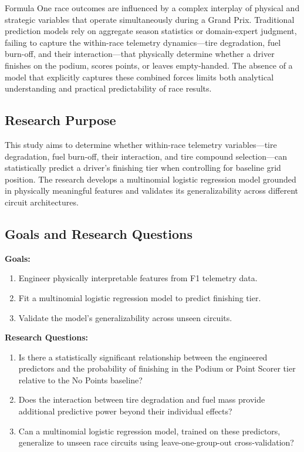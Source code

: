 Formula One race outcomes are influenced by a complex interplay of physical
and strategic variables that operate simultaneously during a Grand Prix.
Traditional prediction models rely on aggregate season statistics or
domain-expert judgment, failing to capture the within-race telemetry
dynamics---tire degradation, fuel burn-off, and their interaction---that
physically determine whether a driver finishes on the podium, scores points,
or leaves empty-handed. The absence of a model that explicitly captures these
combined forces limits both analytical understanding and practical
predictability of race results.

\subsection{Research Purpose}

This study aims to determine whether within-race telemetry variables---tire
degradation, fuel burn-off, their interaction, and tire compound
selection---can statistically predict a driver's finishing tier when
controlling for baseline grid position. The research develops a multinomial
logistic regression model grounded in physically meaningful features and
validates its generalizability across different circuit architectures.

\subsection{Goals and Research Questions}

\textbf{Goals:}
\begin{enumerate}
  \item Engineer physically interpretable features from F1 telemetry data.
  \item Fit a multinomial logistic regression model to predict finishing tier.
  \item Validate the model's generalizability across unseen circuits.
\end{enumerate}

\textbf{Research Questions:}
\begin{enumerate}
  \item Is there a statistically significant relationship between the
    engineered predictors and the probability of finishing in the Podium or
    Point Scorer tier relative to the No Points baseline?
  \item Does the interaction between tire degradation and fuel mass provide
    additional predictive power beyond their individual effects?
  \item Can a multinomial logistic regression model, trained on these
    predictors, generalize to unseen race circuits using leave-one-group-out
    cross-validation?
\end{enumerate}

